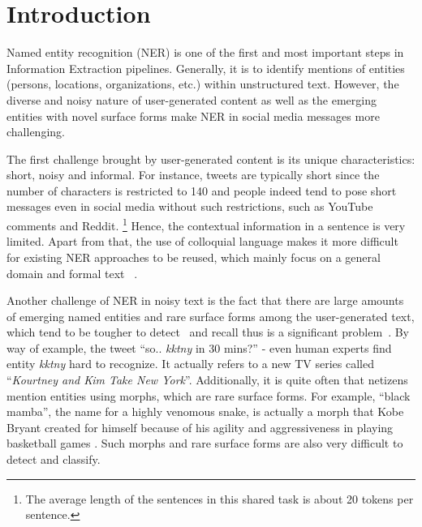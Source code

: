 \section{Introduction}
\label{sec:intro}
Named entity recognition (NER) is one of the first and most important steps in Information Extraction pipelines. 
Generally, it is to identify mentions of entities (persons, locations, organizations, etc.)
within unstructured text. 
However, the diverse and noisy nature of user-generated content as well as the emerging entities with novel surface forms make NER in social media messages more challenging.

The first challenge brought by user-generated content
is its unique characteristics: short, noisy and informal. 
For instance, tweets are typically short since the number of characters is restricted to 140 and people indeed tend to pose short messages even in social media without such restrictions, such as YouTube comments and Reddit.
\footnote{The average length of the sentences in this shared task is about 20 tokens per sentence.}
Hence, the contextual information in a sentence is very limited.
Apart from that, 
the use of colloquial language makes it more difficult for existing NER approaches to be reused, which mainly focus on a general domain and formal text ~\cite{baldwin2015shared, derczynski2015analysis}. 

Another challenge of NER in noisy text is the fact that there are large amounts of emerging named entities and rare surface forms among the user-generated text, which tend to be tougher to detect~\cite{augenstein2017generalisation} and recall thus is a significant problem~\cite{derczynski2015analysis}.
By way of example, the tweet ``so.. \textit{kktny} in 30 mins?'' - even human experts find entity \textit{kktny} hard to recognize. 
It actually refers to a new TV series called ``\textit{Kourtney and Kim Take New York}''. 
Additionally, it is quite often that netizens mention entities using morphs, which are rare surface forms. 
For example, “black mamba”, the name for a
highly venomous snake, is actually a morph that
Kobe Bryant created for himself because of his
agility and aggressiveness in playing basketball
games \cite{DBLP:conf/acl/ZhangHPLLJKWSHY15}.
Such morphs and rare surface forms are also very difficult to detect and classify. 

